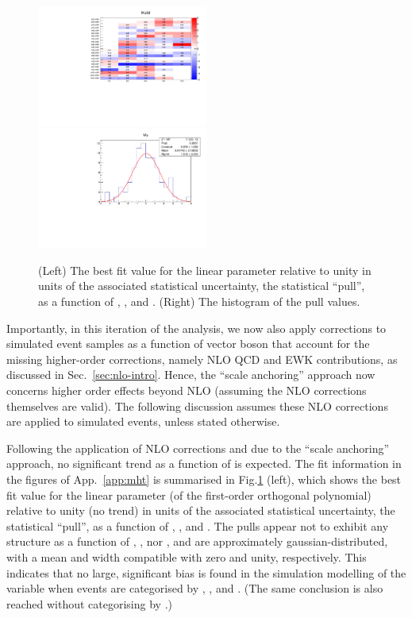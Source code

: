 \begin{figure}[h!]
  \centering
  \includegraphics[width=0.5\textwidth]{figures/mhtTemplate/exclusive/Mu_2D}~
  \includegraphics[width=0.5\textwidth]{figures/mhtTemplate/exclusive/Mu}\\
  \caption{(Left) The best fit value for the linear parameter
    relative to unity in units of the associated statistical
    uncertainty, \ie the statistical ``pull'', as a function of \njet,
    \nb, and \scalht. (Right) The histogram of the pull values.}
  \label{fig:pulls} 
\end{figure}

Importantly, in this iteration of the analysis, we now also apply
corrections to simulated event samples as a function of vector boson
\Pt that account for the missing higher-order corrections, namely NLO
QCD and EWK contributions, as discussed in
Sec.~\ref{sec:nlo-intro}. Hence, the ``scale anchoring'' approach now
concerns higher order effects beyond NLO (assuming the NLO corrections
themselves are valid). The following discussion assumes these NLO
corrections are applied to simulated events, unless stated otherwise. 

Following the application of NLO corrections and due to the ``scale
anchoring'' approach, no significant trend as a function of \mht is
expected. The fit information in the figures of App.~\ref{app:mht} is
summarised in Fig.\ref{fig:pulls} (left), which shows the best fit
value for the linear parameter (of the first-order orthogonal
polynomial) relative to unity (\ie no trend) in units of the
associated statistical uncertainty, \ie the statistical ``pull'', as a
function of \njet, \nb, and \scalht. The pulls appear not to exhibit
any structure as a function of \njet, \nb, nor \scalht, and are
approximately gaussian-distributed, with a mean and width compatible
with zero and unity, respectively. This indicates that no large,
significant bias is found in the simulation modelling of the \mht
variable when events are categorised by \njet, \scalht, and \nb. (The
same conclusion is also reached without categorising by \nb.)

